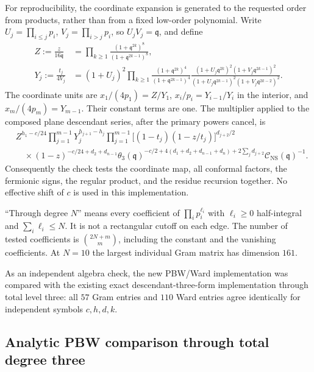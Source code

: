 \documentclass[11pt]{article}
\numberwithin{equation}{section}
\newcommand{\NS}{\mathrm{NS}}
\newcommand{\fq}{\mathfrak q}
\newcommand{\cC}{\mathcal C}
\begin{document}
For reproducibility, the coordinate expansion is generated to the
requested order from products, rather than from a fixed low-order
polynomial. Write $U_j=\prod_{i\leq j}p_i$,
$V_j=\prod_{i>j}p_i$, so $U_jV_j=\fq$, and define
\begin{align}
 Z:=\frac{z}{16\fq}
 &=\prod_{k\geq1}\frac{(1+\fq^{2k})^8}{(1+\fq^{2k-1})^8},
 \label{eq:audit-Z}\\
 Y_j:=\frac{t_j}{4V_j}
 &=(1+U_j)^2\prod_{k\geq1}
 \frac{(1+\fq^{2k})^4}{(1+\fq^{2k-1})^4}
 \frac{(1+U_j\fq^{2k})^2(1+V_j\fq^{2k-1})^2}
      {(1+U_j\fq^{2k-1})^2(1+V_j\fq^{2k-2})^2}.
 \label{eq:audit-Y}
\end{align}
The coordinate units are $x_1/(4p_1)=Z/Y_1$,
$x_i/p_i=Y_{i-1}/Y_i$ in the interior, and $x_m/(4p_m)=Y_{m-1}$.
Their constant terms are one. The multiplier applied to the composed
plane descendant series, after the primary powers cancel, is
\begin{equation}
 \begin{split}
 &Z^{h_1-c/24}\prod_{j=1}^{m-1}Y_j^{h_{j+1}-h_j}
 \prod_{j=1}^{m-1}\bigl[(1-t_j)(1-z/t_j)\bigr]^{d_{j+2}/2}\\
 &\quad\times(1-z)^{-c/24+d_2+d_{n-1}}
 \theta_3(\fq)^{-c/2+4(d_1+d_2+d_{n-1}+d_n)
                        +2\sum_jd_{j+2}}
 \cC_{\NS}(\fq)^{-1}.
 \end{split}
 \label{eq:audit-multiplier}
\end{equation}
Consequently the check tests the coordinate map, all conformal factors,
the fermionic signs, the regular product, and the residue recursion
together. No effective shift of $c$ is used in this implementation.

``Through degree $N$'' means every coefficient of
$\prod_i p_i^{\ell_i}$ with $\ell_i\geq0$ half-integral and
$\sum_i\ell_i\leq N$. It is not a rectangular cutoff on each edge.
The number of tested coefficients is $\binom{2N+m}{m}$, including the
constant and the vanishing coefficients. At $N=10$ the largest individual
Gram matrix has dimension $161$.

As an independent algebra check, the new PBW/Ward implementation was
compared with the existing exact descendant-three-form implementation
through total level three: all $57$ Gram entries and $110$ Ward entries
agree identically for independent symbols $c,h,d,k$.

\subsection{Analytic PBW comparison through total degree three}
\end{document}
